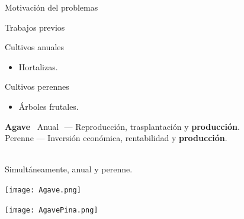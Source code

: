 \documentclass[aspectratio=169]{beamer}
\begin{document}
\begin{frame}{Motivación del problemas}
	\begin{block}{\centering Trabajos previos}
		\begin{minipage}{0.5\textwidth}
			Cultivos anuales
			\begin{itemize}
				\item Hortalizas.
			\end{itemize}
		\end{minipage}%
		\begin{minipage}{0.5\textwidth}
			Cultivos perennes
			\begin{itemize}
				\item Árboles frutales.
			\end{itemize}
		\end{minipage}
	\end{block}
	\centering\begin{minipage}{0.75\textwidth}
		\begin{block}{\bf Agave}
			\,\,\,Anual\,\, --- Reproducción, trasplantación y {\bf producción}.\\
			Perenne --- Inversión económica, rentabilidad y {\bf producción}. 
		\end{block}
	\end{minipage}
	
	\,\\
	
	\centering \Large  Simultáneamente, anual y perenne.\\
	
	\begin{minipage}{0.5\textwidth}
		\vspace{-1.5cm}\raggedright\texttt{[image: Agave.png]}\hfill
	\end{minipage}%
	\begin{minipage}{0.5\textwidth}
		\vspace{-1cm}\raggedleft\texttt{[image: AgavePina.png]}
	\end{minipage}%
\end{frame}
\end{document}
